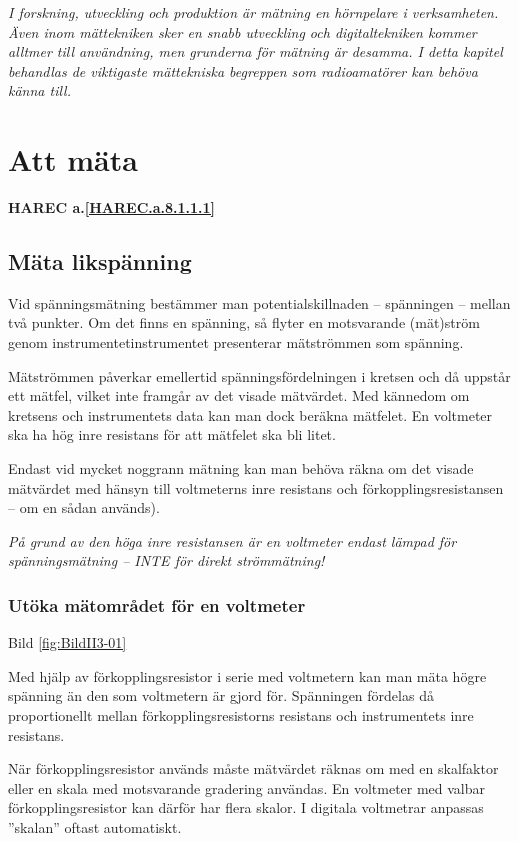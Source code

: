 \emph{I forskning, utveckling och produktion är mätning en hörnpelare
  i verksamheten. Även inom mättekniken sker en snabb utveckling och
  digitaltekniken kommer alltmer till användning, men grunderna för
  mätning är desamma. I detta kapitel behandlas de viktigaste
  mättekniska begreppen som radioamatörer kan behöva känna till.}

\section{Att mäta}
\textbf{
HAREC a.\ref{HAREC.a.8.1.1.1}\label{myHAREC.a.8.1.1.1}
}

\subsection{Mäta likspänning}

Vid spänningsmätning bestämmer man potentialskillnaden -- spänningen --
mellan två punkter. Om det finns en spänning, så flyter en motsvarande
(mät)ström genom instrumentetinstrumentet presenterar mätströmmen som
spänning.

Mätströmmen påverkar emellertid spänningsfördelningen i kretsen och då
uppstår ett mätfel, vilket inte framgår av det visade mätvärdet. Med
kännedom om kretsens och instrumentets data kan man dock beräkna
mätfelet. En voltmeter ska ha hög inre resistans för att mätfelet
ska bli litet.

Endast vid mycket noggrann mätning kan man behöva räkna om det visade
mätvärdet med hänsyn till voltmeterns inre resistans och
förkopplingsresistansen -- om en sådan används).

\emph{På grund av den höga inre resistansen är en voltmeter endast
  lämpad för spänningsmätning -- INTE för direkt strömmätning!}

\subsubsection{Utöka mätområdet för en voltmeter}

Bild \ref{fig:BildII3-01}

Med hjälp av förkopplingsresistor i serie med voltmetern kan man mäta
högre spänning än den som voltmetern är gjord för.
Spänningen fördelas då proportionellt mellan förkopplingsresistorns resistans
och instrumentets inre resistans.

När förkopplingsresistor används måste mätvärdet räknas om med en
skalfaktor eller en skala med motsvarande gradering användas. En
voltmeter med valbar förkopplingsresistor kan därför har flera
skalor. I digitala voltmetrar anpassas ''skalan'' oftast automatiskt.

